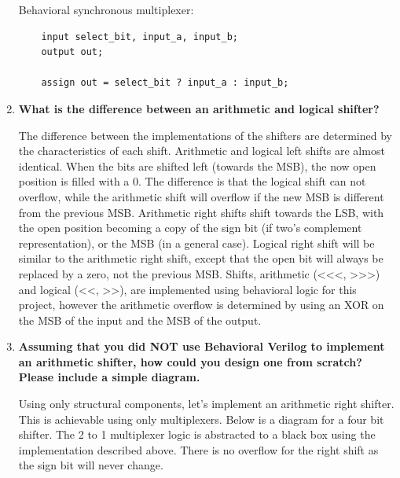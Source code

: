 \documentclass[11pt]{article}
\begin{document}
\begin{enumerate}
	Behavioral synchronous multiplexer:
	
	\begin{lstlisting}
	input select_bit, input_a, input_b;
	output out;
	
	assign out = select_bit ? input_a : input_b;
	\end{lstlisting}
	
	\item \textbf{What is the difference between an arithmetic and logical shifter?}
	
	The difference between the implementations of the shifters are determined by the characteristics of each shift. Arithmetic and logical left shifts are almost identical. When the bits are shifted left (towards the MSB), the now open position is filled with a 0. The difference is that the logical shift can not overflow, while the arithmetic shift will overflow if the new MSB is different from the previous MSB. Arithmetic right shifts shift towards the LSB, with the open position becoming a copy of the sign bit (if two's complement representation), or the MSB (in a general case). Logical right shift will be similar to the arithmetic right shift, except that the open bit will always be replaced by a zero, not the previous MSB. Shifts, arithmetic (<<<, >>>) and logical (<<, >>), are implemented using behavioral logic for this project, however the arithmetic overflow is determined by using an XOR on the MSB of the input and the MSB of the output. 
	
	\item \textbf{Assuming that you did NOT use Behavioral Verilog to implement an arithmetic shifter, how could you design one from scratch? Please include a simple diagram.}
	
	Using only structural components, let's implement an arithmetic right shifter. This is achievable using only multiplexers. Below is a diagram for a four bit shifter. The 2 to 1 multiplexer logic is abstracted to a black box using the implementation described above. There is no overflow for the right shift as the sign bit will never change.
	
	{\centering
	}
\end{enumerate}
\end{document}
